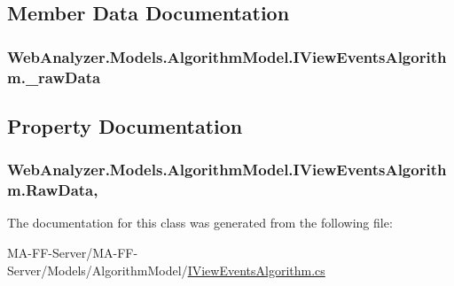 \subsection{Member Data Documentation}
\hypertarget{class_web_analyzer_1_1_models_1_1_algorithm_model_1_1_i_view_events_algorithm_a61794c588714f70bca962727c730b52c}{}
\subsubsection[{\+\_\+raw\+Data}]{ Web\+Analyzer.\+Models.\+Algorithm\+Model.\+I\+View\+Events\+Algorithm.\+\_\+raw\+Data\hspace{0.3cm}{\ttfamily [private]}}\label{class_web_analyzer_1_1_models_1_1_algorithm_model_1_1_i_view_events_algorithm_a61794c588714f70bca962727c730b52c}


\subsection{Property Documentation}
\hypertarget{class_web_analyzer_1_1_models_1_1_algorithm_model_1_1_i_view_events_algorithm_a1fbc48724f9cc7bea3d6ee03d9d533eb}{}
\subsubsection[{Raw\+Data}]{ Web\+Analyzer.\+Models.\+Algorithm\+Model.\+I\+View\+Events\+Algorithm.\+Raw\+Data\hspace{0.3cm}{\ttfamily [get]}, {\ttfamily [set]}}\label{class_web_analyzer_1_1_models_1_1_algorithm_model_1_1_i_view_events_algorithm_a1fbc48724f9cc7bea3d6ee03d9d533eb}


The documentation for this class was generated from the following file\+:\begin{DoxyCompactItemize}
\item 
M\+A-\/\+F\+F-\/\+Server/\+M\+A-\/\+F\+F-\/\+Server/\+Models/\+Algorithm\+Model/\hyperlink{_i_view_events_algorithm_8cs}{I\+View\+Events\+Algorithm.\+cs}\end{DoxyCompactItemize}
